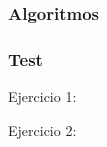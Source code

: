 \documentclass[11pt, a4paper,english,spanish]{article}
\begin{document}


\subsubsection{Algoritmos}



\subsubsection{Test}

Ejercicio 1:





Ejercicio 2:



\appendix
\end{document}
